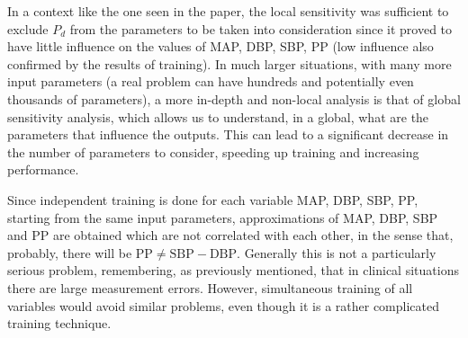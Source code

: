 In a context like the one seen in the paper, the local sensitivity was sufficient to exclude $P_d$ from the parameters to be taken into consideration since it proved to have little influence on the values of MAP, DBP, SBP, PP (low influence also confirmed by the results of training). In much larger situations, with many more input parameters (a real problem can have hundreds and potentially even thousands of parameters), a more in-depth and non-local analysis is that of global sensitivity analysis, which allows us to understand, in a global, what are the parameters that influence the outputs. This can lead to a significant decrease in the number of parameters to consider, speeding up training and increasing performance.

Since independent training is done for each variable MAP, DBP, SBP, PP, starting from the same input parameters, approximations of MAP, DBP, SBP and PP are obtained which are not correlated with each other, in the sense that, probably, there will be $\text{PP}\neq \text{SBP} - \text{DBP}$. Generally this is not a particularly serious problem, remembering, as previously mentioned, that in clinical situations there are large measurement errors. However, simultaneous training of all variables would avoid similar problems, even though it is a rather complicated training technique.
